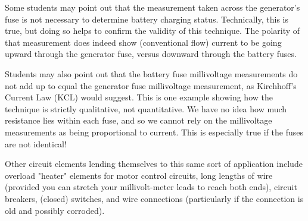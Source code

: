 Some students may point out that the measurement taken across the generator's fuse is not necessary to determine battery charging status.  Technically, this is true, but doing so helps to confirm the validity of this technique.  The polarity of that measurement does indeed show (conventional flow) current to be going upward through the generator fuse, versus downward through the battery fuses.

Students may also point out that the battery fuse millivoltage measurements do not add up to equal the generator fuse millivoltage measurement, as Kirchhoff's Current Law (KCL) would suggest.  This is one example showing how the technique is strictly qualitative, not quantitative.  We have no idea how much resistance lies within each fuse, and so we cannot rely on the millivoltage measurements as being proportional to current.  This is especially true if the fuses are not identical!

Other circuit elements lending themselves to this same sort of application include overload "heater" elements for motor control circuits, long lengths of wire (provided you can stretch your millivolt-meter leads to reach both ends), circuit breakers, (closed) switches, and wire connections (particularly if the connection is old and possibly corroded).




